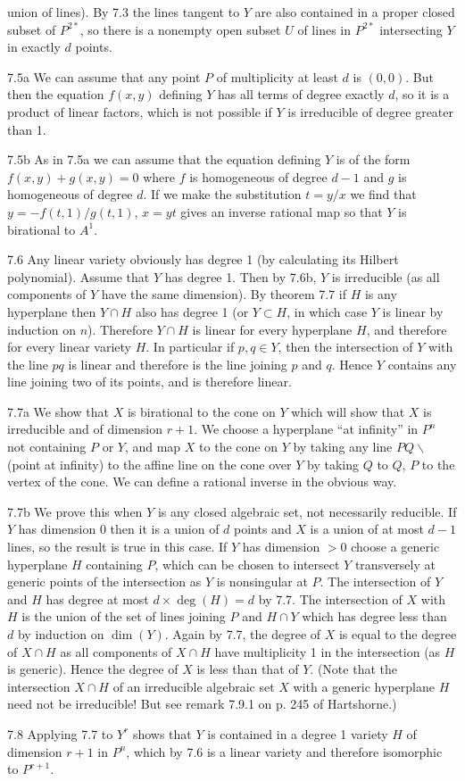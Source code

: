 union of lines). By 7.3 the lines tangent to $Y$ are also contained in
a proper closed subset of $P^{2*}$, so there is a nonempty open subset
$U$ of lines in $P^{2*}$ intersecting $Y$ in exactly $d$ points.
\item{7.5a} We can assume that any point $P$ of multiplicity 
at least $d$ is $(0,0)$. But then the equation $f(x,y)$ defining 
$Y$ has all terms of degree exactly $d$, so it is a product of
linear factors, which is not possible if $Y$ is irreducible
of degree greater than 1. 
\item{7.5b} As in 7.5a we can assume that 
the equation defining $Y$ is of the form
$f(x,y)+g(x,y)=0$ where $f$ is homogeneous of degree $d-1$ and $g$ is
homogeneous of degree $d$. If we make the substitution $t=y/x$
we find that $y=-f(t,1)/g(t,1)$, $x=yt$ gives 
an inverse rational map so that $Y$ is birational to $A^1$. 
\item{7.6} Any linear variety obviously has degree 1
(by calculating its Hilbert polynomial). Assume that $Y$ has degree 1. 
Then by 7.6b, $Y$ is irreducible (as all components of $Y$ 
have the same dimension). By theorem 7.7 if $H$ is any hyperplane
then $Y\cap H$ also has degree 1 (or $Y\subset H$, in which case 
$Y$ is linear
by induction on $n$). Therefore $Y\cap H$ is linear for every hyperplane
$H$, and therefore for every linear variety $H$. In particular
if $p,q\in Y$, then the intersection of $Y$ with the line $pq$
is linear and therefore is the line joining $p$ and $q$. 
Hence $Y$ contains any line joining two of its points, 
and is therefore linear. 
\item{7.7a} We show that $X$ is birational to the cone on $Y$ 
which will show that $X$ is irreducible and of dimension $r+1$. 
We choose a hyperplane ``at infinity'' in $P^n$ not containing $P$
or $Y$, and map $X$ to the cone on $Y$ by taking 
any line $PQ\backslash$(point at infinity) to the affine 
line on the cone over $Y$ 
by taking $Q$ to $Q$, $P$ to the vertex of the cone. We can define a rational 
inverse in the obvious way.
\item{7.7b} We prove this when $Y$ is any closed algebraic set,
not necessarily reducible. If $Y$ has dimension 0 then it
is a union of $d$ points and $X$ is a union of at most 
$d-1$ lines, so the result is true in this case. 
If $Y$ has dimension $>0$ choose a generic hyperplane 
$H$ containing $P$, which can be chosen to intersect $Y$ transversely
at generic points of the intersection as $Y$ is nonsingular at $P$.
 The intersection of $Y$ and $H$ has
degree at most $d\times \deg(H)=d$ by 7.7. The intersection of $X$
with $H$ is the union of the set of lines joining
$P$ and $H\cap Y$ which has degree less than $d$ by induction 
on $\dim(Y)$. Again by 7.7, the degree of $X$ is equal to the degree
of $X\cap H$ as all components of $X\cap H$ have multiplicity 
1 in the intersection (as $H$ is generic). Hence the degree
of $X$ is less than that of $Y$. (Note that the intersection $X\cap H$
of an irreducible algebraic set $X$ with a generic hyperplane $H$
need not be irreducible! But see remark 7.9.1 on p. 245
of Hartshorne.) 
\item{7.8} Applying 7.7 to $Y^r$ shows that $Y$ is contained in 
a degree 1 variety $H$ of dimension $r+1$ in $P^n$, which by 7.6 is a
linear variety and therefore isomorphic to $P^{r+1}$. 
\bye
